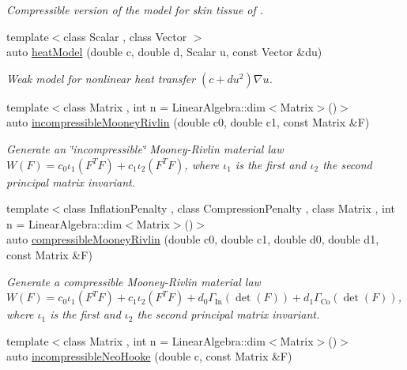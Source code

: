 \begin{DoxyCompactItemize}
\begin{DoxyCompactList}\small\item\em Compressible version of the model for skin tissue of \cite{Hendriks2005}. \end{DoxyCompactList}\item 
{\footnotesize template$<$class Scalar , class Vector $>$ }\\auto \hyperlink{namespaceFunG_aab17a1468e61f58564333b3fcd7900d6}{heat\+Model} (double c, double d, Scalar u, const Vector \&du)
\begin{DoxyCompactList}\small\item\em Weak model for nonlinear heat transfer $ (c+du^2)\nabla u $. \end{DoxyCompactList}\item 
{\footnotesize template$<$class Matrix , int n = Linear\+Algebra\+::dim$<$\+Matrix$>$()$>$ }\\auto \hyperlink{group__Rubber_gace19173e33490aadd36ae3a03fd1d85c}{incompressible\+Mooney\+Rivlin} (double c0, double c1, const Matrix \&F)
\begin{DoxyCompactList}\small\item\em Generate an \char`\"{}incompressible\char`\"{} Mooney-\/\+Rivlin material law $ W(F)=c_0\iota_1(F^T F) + c_1\iota_2(F^T F) $, where $\iota_1$ is the first and $\iota_2$ the second principal matrix invariant. \end{DoxyCompactList}\item 
{\footnotesize template$<$class Inflation\+Penalty , class Compression\+Penalty , class Matrix , int n = Linear\+Algebra\+::dim$<$\+Matrix$>$()$>$ }\\auto \hyperlink{group__Rubber_ga9a1894daa10a0bdcc620c6c41ecb6f19}{compressible\+Mooney\+Rivlin} (double c0, double c1, double d0, double d1, const Matrix \&F)
\begin{DoxyCompactList}\small\item\em Generate a compressible Mooney-\/\+Rivlin material law $ W(F)=c_0\iota_1(F^T F) + c_1\iota_2(F^T F) + d_0\Gamma_\mathrm{In}(\det(F))+d_1\Gamma_\mathrm{Co}(\det(F)) $, where $\iota_1$ is the first and $\iota_2$ the second principal matrix invariant. \end{DoxyCompactList}\item 
{\footnotesize template$<$class Matrix , int n = Linear\+Algebra\+::dim$<$\+Matrix$>$()$>$ }\\auto \hyperlink{group__Rubber_ga5bb28aef7006413775791998936d6b81}{incompressible\+Neo\+Hooke} (double c, const Matrix \&F)

\end{DoxyCompactItemize}
